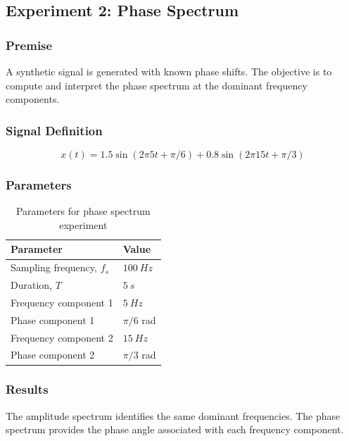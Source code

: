 \documentclass[11pt,a4paper]{article}
\begin{document}
\subsection{Experiment 2: Phase Spectrum}

\subsubsection{Premise}

A synthetic signal is generated with known phase shifts. The objective is to compute and interpret the phase spectrum at the dominant frequency components.

\subsubsection{Signal Definition}

\begin{equation}
    x(t) =
    1.5 \sin(2\pi 5t + \pi/6)
    +
    0.8 \sin(2\pi 15t + \pi/3)
\end{equation}

\subsubsection{Parameters}

\begin{table}[H]
\centering
\caption{Parameters for phase spectrum experiment}
\begin{tabular}{ll}
\toprule
Parameter & Value \\
\midrule
Sampling frequency, \(f_s\) & \(100\ \si{Hz}\) \\
Duration, \(T\) & \(5\ \si{s}\) \\
Frequency component 1 & \(5\ \si{Hz}\) \\
Phase component 1 & \(\pi/6\) rad \\
Frequency component 2 & \(15\ \si{Hz}\) \\
Phase component 2 & \(\pi/3\) rad \\
\bottomrule
\end{tabular}
\end{table}

\subsubsection{Results}

The amplitude spectrum identifies the same dominant frequencies. The phase spectrum provides the phase angle associated with each frequency component.
\end{document}
